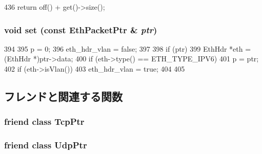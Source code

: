 \begin{DoxyCode}
436 { return off() + get()->size(); }
\end{DoxyCode}
\hypertarget{classNet_1_1Ip6Ptr_af1faec8f5ac9a74b80fa6ce84b17a7c6}{
\subsubsection[{set}]{\setlength{\rightskip}{0pt plus 5cm}void set (const {\bf EthPacketPtr} \& {\em ptr})}}
\label{classNet_1_1Ip6Ptr_af1faec8f5ac9a74b80fa6ce84b17a7c6}



\begin{DoxyCode}
394     {
395         p = 0;
396         eth_hdr_vlan = false;
397 
398         if (ptr) {
399             EthHdr *eth = (EthHdr *)ptr->data;
400             if (eth->type() == ETH_TYPE_IPV6)
401                 p = ptr;
402             if (eth->isVlan())
403                 eth_hdr_vlan = true;
404         }
405     }
\end{DoxyCode}


\subsection{フレンドと関連する関数}
\hypertarget{classNet_1_1Ip6Ptr_aaa26166329482f65ba88b88bb72b04ed}{
\subsubsection[{TcpPtr}]{\setlength{\rightskip}{0pt plus 5cm}friend class {\bf TcpPtr}}}
\label{classNet_1_1Ip6Ptr_aaa26166329482f65ba88b88bb72b04ed}
\hypertarget{classNet_1_1Ip6Ptr_ae00019f223a3b97d7f64791d15e438e5}{
\subsubsection[{UdpPtr}]{\setlength{\rightskip}{0pt plus 5cm}friend class {\bf UdpPtr}}}
\label{classNet_1_1Ip6Ptr_ae00019f223a3b97d7f64791d15e438e5}


